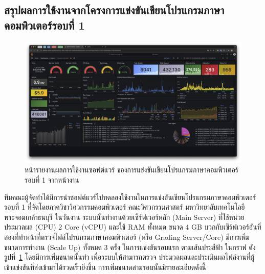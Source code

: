 \documentclass[12pt,one side,openright,a4paper]{cpe-thesis-th}
\newcommand{\thaijustify}[1]{%
  \par\hspace{30pt}\justifying
  #1
}
\begin{document}
\subsection{สรุปผลการใช้งานจากโครงการแข่งขันเขียนโปรแกรมภาษาคอมพิวเตอร์รอบที่ 1}
\begin{figure}[H]
  \centering
  \includegraphics[width=12cm]{figure/results/grafana/grafana-bmh1-raw.png}
  \caption[หน้ารายงานผลการใช้งานซอฟต์แวร์ ของการแข่งขันเขียนโปรแกรมภาษาคอมพิวเตอร์รอบที่ 1 ถ่ายจากหน้างาน]{หน้ารายงานผลการใช้งานซอฟต์แวร์ ของการแข่งขันเขียนโปรแกรมภาษาคอมพิวเตอร์รอบที่ 1 จากหน้างาน}
  \label{fig:res-grafana-bmh1}
\end{figure}
\thaijustify{
  ทีมคณะผู้จัดทำได้มีการนำซอฟต์แวร์ไปทดลองใช้งานในการแข่งขันเขียนโปรแกรมภาษาคอมพิวเตอร์รอบที่ 1 ที่จัดโดยภาควิชาวิศวกรรมคอมพิวเตอร์ คณะวิศวกรรมศาสตร์ มหาวิทยาลับเทคโนโลยีพระจอมเกล้าธนบุรี ในวันงาน ระบบนั้นทำงานด้วยเซิร์ฟเวอร์หลัก (Main Server) ที่ใช้หน่วยประมวลผล (CPU) 2 Core (vCPU) และใช้ RAM ทั้งหมด ขนาด 4 GB บวกกับเซิร์ฟเวอร์อันที่สองที่ทำหน้าที่ตรวจไฟล์โปรแกรมภาษาคอมพิวเตอร์ (หรือ Grading Server/Core) มีการเพิ่มขนาดการทำงาน (Scale Up) ทั้งหมด 3 ครั้ง ในการแข่งขันรอบแรก ตามเส้นประสีฟ้า ในกราฟ ดังรูปที่~\ref{fig:res-grafana-bmh1} โดยมีการเพิ่มขนาดนั้นทำ เพื่อระบบให้สามารถตรวจ ประมวลผลและประเมินผลไฟล์งานที่ผู้เข้าแข่งขันที่ส่งเข้ามาได้รวดเร็วยิ่งขึ้น การเพิ่มขนาดสามรอบนั้นมีรายละเอียดดังนี้
}
\end{document}
